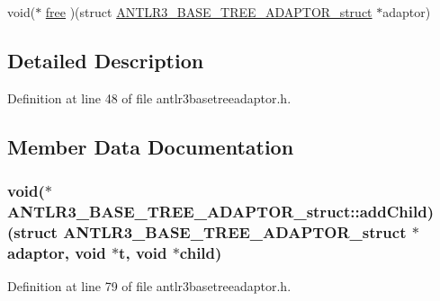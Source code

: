 \begin{DoxyCompactItemize}
\item 
void($\ast$ \hyperlink{struct_a_n_t_l_r3___b_a_s_e___t_r_e_e___a_d_a_p_t_o_r__struct_ab78f0e016547e49805a68c1620d14073}{free} )(struct \hyperlink{struct_a_n_t_l_r3___b_a_s_e___t_r_e_e___a_d_a_p_t_o_r__struct}{A\-N\-T\-L\-R3\-\_\-\-B\-A\-S\-E\-\_\-\-T\-R\-E\-E\-\_\-\-A\-D\-A\-P\-T\-O\-R\-\_\-struct} $\ast$adaptor)
\end{DoxyCompactItemize}


\subsection{Detailed Description}


Definition at line 48 of file antlr3basetreeadaptor.\-h.



\subsection{Member Data Documentation}
\hypertarget{struct_a_n_t_l_r3___b_a_s_e___t_r_e_e___a_d_a_p_t_o_r__struct_ae04a60c7a36f1cddb51a243c19bbb71a}{
\subsubsection[{add\-Child}]{\setlength{\rightskip}{0pt plus 5cm}void($\ast$ A\-N\-T\-L\-R3\-\_\-\-B\-A\-S\-E\-\_\-\-T\-R\-E\-E\-\_\-\-A\-D\-A\-P\-T\-O\-R\-\_\-struct\-::add\-Child)(struct {\bf A\-N\-T\-L\-R3\-\_\-\-B\-A\-S\-E\-\_\-\-T\-R\-E\-E\-\_\-\-A\-D\-A\-P\-T\-O\-R\-\_\-struct} $\ast$adaptor, void $\ast${\bf t}, void $\ast$child)}}\label{struct_a_n_t_l_r3___b_a_s_e___t_r_e_e___a_d_a_p_t_o_r__struct_ae04a60c7a36f1cddb51a243c19bbb71a}


Definition at line 79 of file antlr3basetreeadaptor.\-h.

